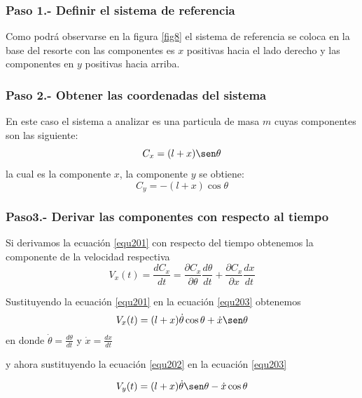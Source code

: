\documentclass[12pt]{book}
\theoremstyle{definition}
\theoremstyle{remark}
\theoremstyle{plain}
\begin{document}
\subsubsection{Paso 1.- Definir el sistema de referencia}

Como podrá observarse en la figura \ref{fig8} el sistema de referencia se coloca en la base del resorte con las componentes es $x$ positivas hacia el lado derecho y las componentes en $y$ positivas hacia arriba.

\subsubsection{Paso 2.- Obtener las coordenadas del sistema }
En este caso el sistema a analizar es una particula de masa $m$  cuyas componentes son las siguiente:
\begin{equation}
\label{equ201}
C_x = (l+x) \sen \theta
\end{equation}
la cual es la componente $x$, la componente $y$ se obtiene:
\begin{equation}
\label{equ202}
C_y = - (l+x) \cos \theta
\end{equation}

\subsubsection{Paso3.-  Derivar las componentes con respecto al tiempo}

Si derivamos la ecuación \ref{equ201} con respecto del tiempo obtenemos la componente de la velocidad respectiva
\begin{equation}
\label{equ203}
V_x (t)= \frac{d C_x}{d t} = \frac{\partial C_x}{\partial \theta} \frac{d \theta}{d t}+ \frac{\partial C_x}{\partial x} \frac{d x}{d t}
\end{equation}

Sustituyendo la ecuación \ref{equ201}  en la ecuación \ref{equ203} obtenemos
\begin{equation}
\label{equ204}
V_x (t)= (l+x) \dot{\theta} \cos \theta+ \dot{x} \sen \theta 
\end{equation}  
en donde $\dot{\theta}=\frac{d \theta}{d t}$ y $\dot{x}=\frac{d x}{d t}$

y ahora sustituyendo  la ecuación \ref{equ202}  en la ecuación \ref{equ203} 

\begin{equation}
\label{equ205}
V_y (t)= (l+x) \dot{\theta} \sen \theta-  \dot{x} \cos \theta 
\end{equation}  
\end{document}
